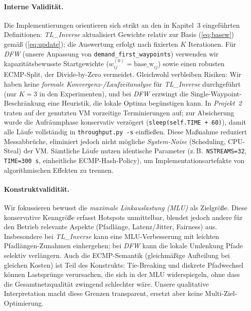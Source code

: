 \documentclass[sigconf,nonacm,review]{acmart}
\begin{document}
\paragraph{Interne Validität.}
Die Implementierungen orientieren sich strikt an den in Kapitel~3 eingeführten Definitionen: \emph{TL\_Inverse} aktualisiert Gewichte relativ zur Basis (\eqref{eq:basew}) gemäß (\ref{eq:update}); die Auswertung erfolgt nach fixierten $K$ Iterationen. Für \emph{DFW} (unsere Anpassung von \texttt{demand\_first\_waypoints}) verwenden wir kapazitätsbewusste Startgewichte ($w^{(0)}_{ij}=\mathrm{base\_w}_{ij}$) sowie einen robusten ECMP-Split, der Divide-by-Zero vermeidet. Gleichwohl verbleiben Risiken: Wir haben keine \emph{formale Konvergenz-/Laufzeitanalyse} für \emph{TL\_Inverse} durchgeführt (nur $K{=}3$ in den Experimenten), und bei \emph{DFW} erzwingt die Single-Waypoint-Beschränkung eine Heuristik, die lokale Optima begünstigen kann. In \textit{Projekt~2} traten auf der genutzten VM vorzeitige Terminierungen auf; zur Absicherung wurde die Aufräumphase konservativ verzögert (\texttt{sleep(self.TIME + 60)}), damit alle Läufe vollständig in \texttt{throughput.py -s} einfließen. Diese Maßnahme reduziert Messabbrüche, eliminiert jedoch nicht mögliche \emph{System-Noise} (Scheduling, CPU-Steal) der VM. Sämtliche Läufe nutzen identische Parameter (z.\,B.\ \texttt{NSTREAMS=32}, \texttt{TIME=300\,s}, einheitliche ECMP-Hash-Policy), um Implementationsartefakte von algorithmischen Effekten zu trennen.

\paragraph{Konstruktvalidität.}
Wir fokussieren bewusst die \emph{maximale Linkauslastung (MLU)} als Zielgröße. Diese konservative Kenngröße erfasst Hotspots unmittelbar, blendet jedoch andere für den Betrieb relevante Aspekte (Pfadlänge, Latenz/Jitter, Fairness) aus. Insbesondere bei \emph{TL\_Inverse} kann eine MLU-Verbesserung mit leichten Pfadlängen-Zunahmen einhergehen; bei \emph{DFW} kann die lokale Umlenkung Pfade selektiv verlängern. Auch die ECMP-Semantik (gleichmäßige Aufteilung bei gleichen Kosten) ist Teil des Konstrukts: Tie-Breaking und diskrete Pfadwechsel können Lastsprünge verursachen, die sich in der MLU widerspiegeln, ohne dass die Gesamtnetzqualität zwingend schlechter wäre. Unsere qualitative Interpretation macht diese Grenzen transparent, ersetzt aber keine Multi-Ziel-Optimierung.
\end{document}
